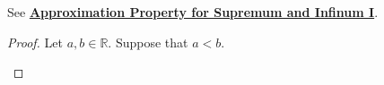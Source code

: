 \documentclass[11pt,openany]{article}
\begin{document}
\begin{remark*}
	See \hyperlink{pro1}{\bf Approximation Property for Supremum and Infinum I}.
\end{remark*}
\newpage
{}
\begin{proof}
Let $a,b\in\mathbb{R}$. Suppose that $a<b$. 
\begin{center}
\end{center} 
\vfill
\end{proof}
\end{document}
